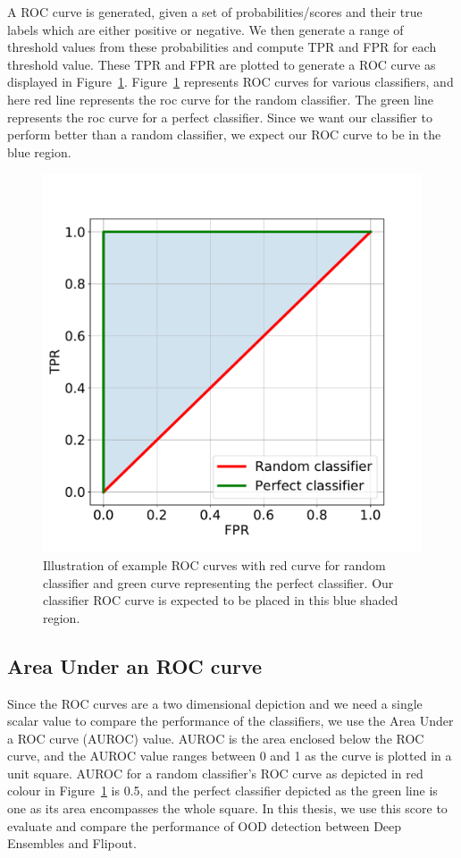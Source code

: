 A ROC curve is generated, given a set of probabilities/scores and their true labels which are either positive or negative.
We then generate a range of threshold values from these probabilities and compute TPR and FPR for each threshold value.
These TPR and FPR are plotted to generate a ROC curve as displayed in Figure~\ref{fig:ROC_curve_example}. 
Figure~\ref{fig:ROC_curve_example} represents ROC curves for various classifiers, and here red line represents the roc curve for the random classifier. The green line represents the roc curve for a perfect classifier.
Since we want our classifier to perform better than a random classifier, we expect our ROC curve to be in the blue region.
\begin{figure}[!ht]
    \centering
    \includegraphics[scale=0.35]{images/ROC_curve_example.pdf}
    \caption{Illustration of example ROC curves with red curve for random classifier and green curve representing the perfect classifier.
    Our classifier ROC curve is expected to be placed in this blue shaded region.}
    \label{fig:ROC_curve_example}
\end{figure}

\subsection{Area Under an ROC curve}
Since the ROC curves are a two dimensional depiction and we need a single scalar value to compare the performance of the classifiers, we use the Area Under a ROC curve (AUROC) value.
AUROC is the area enclosed below the ROC curve, and the AUROC value ranges between 0 and 1 as the curve is plotted in a unit square.
AUROC for a random classifier's ROC curve as depicted in red colour in Figure~\ref{fig:ROC_curve_example} is 0.5, and the perfect classifier depicted as the green line is one as its area encompasses the whole square.
In this thesis, we use this score to evaluate and compare the performance of OOD detection between Deep Ensembles and Flipout.


